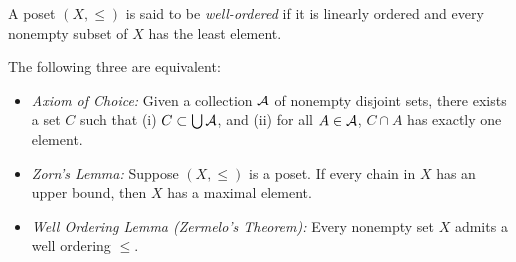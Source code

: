 \documentclass{techreport}
\begin{document}
\begin{definition}
	A poset $(X,{\le})$ is said to be \emph{well-ordered} if it is linearly ordered and every nonempty subset of $X$ has the least element.
\end{definition}

\begin{theorem}
	The following three are equivalent:
	\begin{itemize}
		\item \emph{Axiom of Choice:} Given a collection $\mathcal{A}$ of nonempty disjoint sets, there exists a set $C$ such that (i) $C \subset \bigcup \mathcal{A}$, and (ii) for all $A \in \mathcal{A}$, $C \cap A$ has exactly one element.
		\item \emph{Zorn's Lemma:} Suppose $(X,{\le})$ is a poset. If every chain in $X$ has an upper bound, then $X$ has a maximal element.
		\item \emph{Well Ordering Lemma (Zermelo's Theorem):} Every nonempty set $X$ admits a well ordering ${\le}$.
	\end{itemize}
\end{theorem}
		

%
\end{document}
